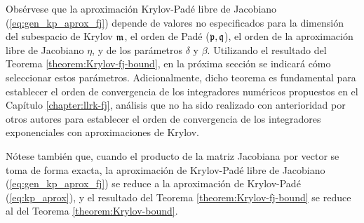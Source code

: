 Obsérvese que la aproximación Krylov-Padé libre de Jacobiano (\ref{eq:gen_kp_aprox_fj}) depende de valores no especificados para la dimensión del subespacio de Krylov $\mathfrak{m}$, el orden de Padé ($\mathfrak{p},\mathfrak{q}$), el orden de la aproximación libre de Jacobiano $\eta$, y de los parámetros $\delta$ y $\beta$. Utilizando el resultado del Teorema \ref{theorem:Krylov-fj-bound}, en la próxima sección se indicará cómo seleccionar estos parámetros. Adicionalmente, dicho teorema es fundamental para establecer el orden de convergencia de los integradores numéricos propuestos en el Capítulo \ref{chapter:llrk-fj}, análisis que no ha sido realizado con anterioridad por otros autores para establecer el orden de convergencia de los integradores exponenciales con aproximaciones de Krylov.


Nótese también que, cuando el producto de la matriz Jacobiana por vector se toma de forma exacta, la aproximación de Krylov-Padé libre de Jacobiano (\ref{eq:gen_kp_aprox_fj}) se reduce a la aproximación de Krylov-Padé (\ref{eq:kp_aprox}), y el resultado del Teorema \ref{theorem:Krylov-fj-bound} se reduce al del Teorema \ref{theorem:Krylov-bound}.

